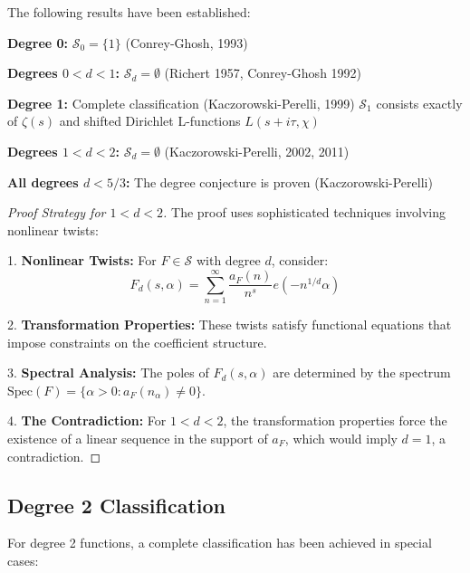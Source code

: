 \begin{theorem}
The following results have been established:

\textbf{Degree 0:} $\mathcal{S}_0 = \{1\}$ (Conrey-Ghosh, 1993)

\textbf{Degrees $0 < d < 1$:} $\mathcal{S}_d = \emptyset$ (Richert 1957, Conrey-Ghosh 1992)

\textbf{Degree 1:} Complete classification (Kaczorowski-Perelli, 1999)
$\mathcal{S}_1$ consists exactly of $\zeta(s)$ and shifted Dirichlet L-functions $L(s+i\tau, \chi)$

\textbf{Degrees $1 < d < 2$:} $\mathcal{S}_d = \emptyset$ (Kaczorowski-Perelli, 2002, 2011)

\textbf{All degrees $d < 5/3$:} The degree conjecture is proven (Kaczorowski-Perelli)
\end{theorem}

\begin{proof}[Proof Strategy for $1 < d < 2$]
The proof uses sophisticated techniques involving nonlinear twists:

1. \textbf{Nonlinear Twists:} For $F \in \mathcal{S}$ with degree $d$, consider:
   \begin{equation}
   F_d(s,\alpha) = \sum_{n=1}^{\infty} \frac{a_F(n)}{n^s} e(-n^{1/d}\alpha)
   \end{equation}

2. \textbf{Transformation Properties:} These twists satisfy functional equations that impose constraints on the coefficient structure.

3. \textbf{Spectral Analysis:} The poles of $F_d(s,\alpha)$ are determined by the spectrum $\text{Spec}(F) = \{\alpha > 0 : a_F(n_\alpha) \neq 0\}$.

4. \textbf{The Contradiction:} For $1 < d < 2$, the transformation properties force the existence of a linear sequence in the support of $a_F$, which would imply $d = 1$, a contradiction.
\end{proof}

\subsection{Degree 2 Classification}

For degree 2 functions, a complete classification has been achieved in special cases:

